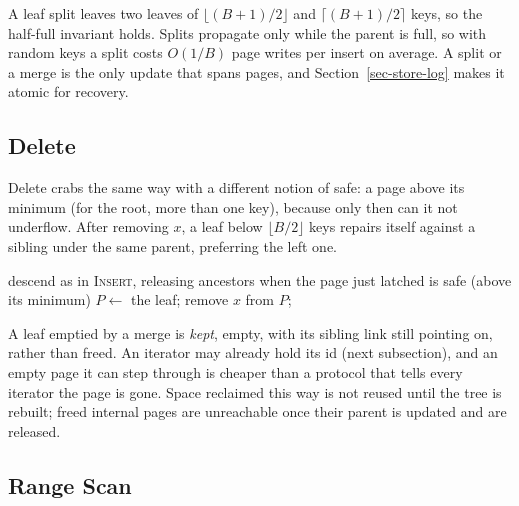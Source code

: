 A leaf split leaves two leaves of $\lfloor (B{+}1)/2\rfloor$ and
$\lceil (B{+}1)/2\rceil$ keys, so the half-full invariant holds.
Splits propagate only while the parent is full, so with random keys a split
costs $O(1/B)$ page writes per insert on average.
A split or a merge is the only update that spans pages, and
Section~\ref{sec-store-log} makes it atomic for recovery.

\subsection{Delete}

Delete crabs the same way with a different notion of safe: a page above its
minimum (for the root, more than one key), because only then can it not
underflow.
After removing $x$, a leaf below $\lfloor B/2\rfloor$ keys repairs itself
against a sibling under the same parent, preferring the left one.

\begin{algorithm}[t]
\caption{\textsc{Remove}$(x)$}\label{alg-remove}
\small
descend as in \textsc{Insert}, releasing ancestors when the page just latched is safe (above its minimum)\;
$P \gets$ the leaf; 
remove $x$ from $P$; 
\end{algorithm}

A leaf emptied by a merge is \emph{kept}, empty, with its sibling link still
pointing on, rather than freed.
An iterator may already hold its id (next subsection), and an empty page it
can step through is cheaper than a protocol that tells every iterator the
page is gone.
Space reclaimed this way is not reused until the tree is rebuilt; freed
internal pages are unreachable once their parent is updated and are
released.

\subsection{Range Scan}

